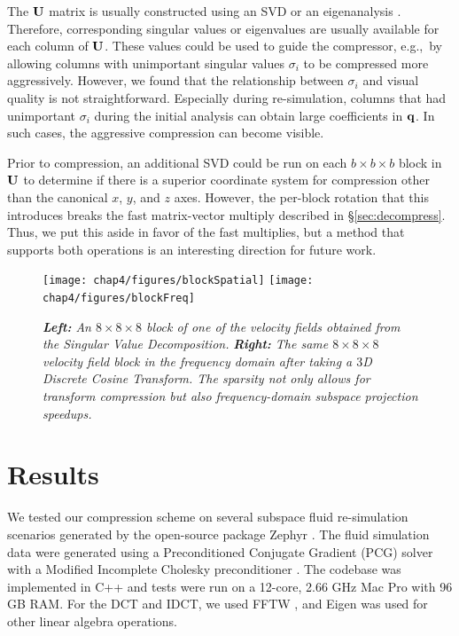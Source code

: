 The $\mathbf{U}$ matrix is usually constructed using an SVD \cite{Treuille:2006:MRF,Kim2013} or an eigenanalysis \cite{deWitt:2012,Liu:2015:MVF}. Therefore, corresponding singular values or eigenvalues are usually available for each column of $\mathbf{U}$. These values could be used to guide the compressor, e.g.,~by allowing columns with unimportant singular values $\sigma_i$ to be compressed more aggressively. However, we found that the relationship between $\sigma_i$ and visual quality is not straightforward. Especially during re-simulation, columns that had unimportant $\sigma_i$ during the initial analysis can obtain large coefficients in $\mathbf{q}$. In such cases, the aggressive compression can become visible.

Prior to compression, an additional SVD could be run on each $b \times b \times b$ block in $\mathbf{U}$ to determine if there is a superior coordinate system for compression other than the canonical $x$, $y$, and $z$ axes. However, the per-block rotation that this introduces breaks the fast matrix-vector multiply described in \S\ref{sec:decompress}. Thus, we put this aside in favor of the fast multiplies, but a method that supports both operations is an interesting direction for future work.

\begin{figure}
		\centering
		\texttt{[image: chap4/figures/blockSpatial]}
		\texttt{[image: chap4/figures/blockFreq]}
		\caption{{\em{\bf Left:} An $8 \times 8 \times 8$ block of one of the velocity fields obtained from the Singular Value Decomposition.} {\em{\bf Right:} The same $8 \times 8 \times 8$ velocity field block in the frequency domain after taking a $3$D Discrete Cosine Transform. The sparsity not only allows for transform compression but also frequency-domain subspace projection speedups.}}
		\label{fig:sparseFreq}
\end{figure}

\section{Results}
\label{sec:Results}

We tested our compression scheme on several subspace fluid re-simulation scenarios generated by the open-source package Zephyr \cite{Kim2013}. The fluid simulation data were generated using a Preconditioned Conjugate Gradient (PCG) solver with a Modified Incomplete Cholesky preconditioner \cite{Bridson:2015}. The codebase was implemented in C++ and tests were run on a 12-core, 2.66 GHz Mac Pro with 96 GB RAM. For the DCT and IDCT, we used FFTW \cite{FFTW05}, and Eigen \cite{eigenweb} was used for other linear algebra operations.

